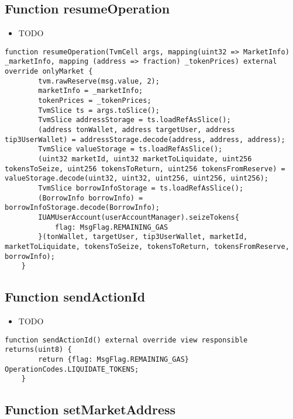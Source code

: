 \subsection{Function resumeOperation}

\noindent\begin{itemize}
\item TODO
\end{itemize}

\begin{lstlisting}[firstnumber=213]
    function resumeOperation(TvmCell args, mapping(uint32 => MarketInfo) _marketInfo, mapping (address => fraction) _tokenPrices) external override onlyMarket {
        tvm.rawReserve(msg.value, 2);
        marketInfo = _marketInfo;
        tokenPrices = _tokenPrices;
        TvmSlice ts = args.toSlice();
        TvmSlice addressStorage = ts.loadRefAsSlice();
        (address tonWallet, address targetUser, address tip3UserWallet) = addressStorage.decode(address, address, address);
        TvmSlice valueStorage = ts.loadRefAsSlice();
        (uint32 marketId, uint32 marketToLiquidate, uint256 tokensToSeize, uint256 tokensToReturn, uint256 tokensFromReserve) = valueStorage.decode(uint32, uint32, uint256, uint256, uint256);
        TvmSlice borrowInfoStorage = ts.loadRefAsSlice();
        (BorrowInfo borrowInfo) = borrowInfoStorage.decode(BorrowInfo);
        IUAMUserAccount(userAccountManager).seizeTokens{
            flag: MsgFlag.REMAINING_GAS
        }(tonWallet, targetUser, tip3UserWallet, marketId, marketToLiquidate, tokensToSeize, tokensToReturn, tokensFromReserve, borrowInfo);
    }
\end{lstlisting}

\subsection{Function sendActionId}

\noindent\begin{itemize}
\item TODO
\end{itemize}

\begin{lstlisting}[firstnumber=57]
    function sendActionId() external override view responsible returns(uint8) {
        return {flag: MsgFlag.REMAINING_GAS} OperationCodes.LIQUIDATE_TOKENS;
    }
\end{lstlisting}

\subsection{Function setMarketAddress}

